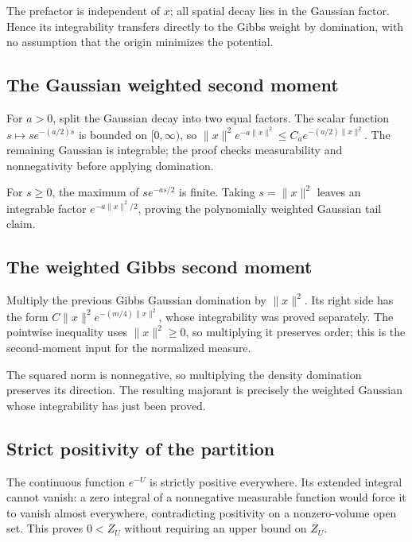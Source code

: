 \documentclass[11pt,a4paper]{report}
\begin{document}
The prefactor is independent of \(x\); all spatial decay lies in the Gaussian factor. Hence its integrability transfers directly to the Gibbs weight by domination, with no assumption that the origin minimizes the potential.

\subsection{\texorpdfstring{The Gaussian weighted second moment}{The Gaussian weighted second moment}}
\label{report-step-UnadjustedLangevin-Gibbs-lean-7}


For \(a>0\), split the Gaussian decay into two equal factors. The scalar function \(s\mapsto s e^{-(a/2)s}\) is bounded on \([0,\infty)\), so \(\|x\|^2e^{-a\|x\|^2}\le C_a e^{-(a/2)\|x\|^2}\). The remaining Gaussian is integrable; the proof checks measurability and nonnegativity before applying domination.



For \(s\ge0\), the maximum of \(s e^{-as/2}\) is finite. Taking \(s=\|x\|^2\) leaves an integrable factor \(e^{-a\|x\|^2/2}\), proving the polynomially weighted Gaussian tail claim.

\subsection{\texorpdfstring{The weighted Gibbs second moment}{The weighted Gibbs second moment}}
\label{report-step-UnadjustedLangevin-Gibbs-lean-8}


Multiply the previous Gibbs Gaussian domination by \(\|x\|^2\). Its right side has the form \(C\|x\|^2e^{-(m/4)\|x\|^2}\), whose integrability was proved separately. The pointwise inequality uses \(\|x\|^2\ge0\), so multiplying it preserves order; this is the second-moment input for the normalized measure.



The squared norm is nonnegative, so multiplying the density domination preserves its direction. The resulting majorant is precisely the weighted Gaussian whose integrability has just been proved.

\subsection{\texorpdfstring{Strict positivity of the partition}{Strict positivity of the partition}}
\label{report-step-UnadjustedLangevin-Gibbs-lean-9}


The continuous function \(e^{-U}\) is strictly positive everywhere. Its extended integral cannot vanish: a zero integral of a nonnegative measurable function would force it to vanish almost everywhere, contradicting positivity on a nonzero-volume open set. This proves \(0<Z_U\) without requiring an upper bound on \(Z_U\).
\end{document}
